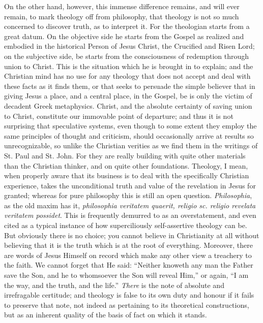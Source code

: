 \documentclass[12pt,a5paper]{article}
\begin{document}
On the other hand, however, this immense difference
remains, and will ever remain, to mark theology off from
philosophy, that theology is not so much concerned to
discover truth, as to interpret it. For the theologian
starts from a great datum. On the objective side he
starts from the Gospel as realized and embodied in the
historical Person of Jesus Christ, the Crucified and Risen
Lord; on the subjective side, be starts from the consciousness
of redemption through union to Christ. This
is the situation which he is brought in to explain; and the
Christian mind has no use for any theology that does not
accept and deal with these facts as it finds them, or that
seeks to persuade the simple believer that in giving Jesus
a place, and a central place, in the Gospel, be is only the
victim of decadent Greek metaphysics. Christ, and the
absolute certainty of saving union to Christ, constitute our
immovable point of departure; and thus it is not surprising
that speculative systems, even though to some extent
they employ the same principles of thought and criticism,
should occasionally arrive at results so unrecognizable, so
unlike the Christian verities as we find them in the writings
of St. Paul and St. John. For they are really building with
quite other materials than the Christian thinker, and on quite
other foundations. Theology, I mean, when properly aware
that its business is to deal with the specifically Christian
experience, takes the unconditional truth and value of the
revelation in Jesus for granted; whereas for pure philosophy
this is still an open question. \textit{Philosophia}, as the old
maxim has it, \textit{philosophia veritatem quaerit, religio sc. religio
revelata veritatem possidet}. This is frequently demurred
to as an overstatement, and even cited as a typical instance
of how superciliously self-assertive theology can be. But
obviously there is no choice; you cannot believe in Christianity 
at all without believing that it is the truth which is
at the root of everything. Moreover, there are words of
Jesus Himself on record which make any other view a
treachery to the faith. We cannot forget that He said:
``Neither knoweth any man the Father save the Son, and
he to whomsoever the Son will reveal Him,'' or again, ``I
am the way, and the truth, and the life.'' \textit{There} is the note
of absolute and irrefragable certitude; and theology is false
to its own duty and honour if it fails to preserve that note,
not indeed as pertaining to its theoretical constructions, but
as an inherent quality of the basis of fact on which it stands.
\end{document}

